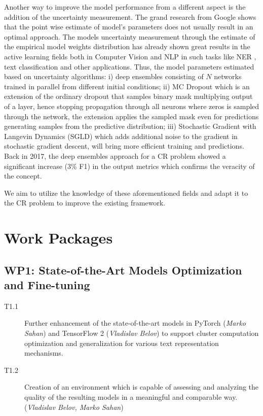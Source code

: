 Another way to improve the model performance from a different aspect is the addition of the uncertainty measurement. 
The grand research from Google \cite{ovadia2019can} shows that the point wise estimate of model’s parameters does not usually result in an optimal approach. The models uncertainty measurement through the estimate of the empirical model weights distribution has already shown great results in the active learning fields both in Computer Vision \cite{gal2017deep} and NLP in such tasks like NER \cite{shen2017deep, lowell2018practical}, text classification \cite{an2018deep} and other applications. 
Thus, the model parameters estimated based on uncertainty algorithms: i) deep ensembles \cite{lakshminarayanan2016simple} consisting of $N$ networks trained in parallel from different initial conditions; ii) MC Dropout \cite{gal2017deep} which is an extension of the ordinary dropout that samples binary mask multiplying output of a layer, hence stopping propagation through all neurons where zeros is sampled through the network, the extension applies the sampled mask even for predictions generating samples from the predictive distribution; iii) Stochastic Gradient with Langevin Dynamics (SGLD) \cite{welling2011bayesian} which adds additional noise to the gradient in stochastic gradient descent, will bring more efficient training and predictions. 
Back in 2017, the deep ensembles approach for a CR problem \cite{cr-Lee17} showed a significant increase (3\% F1) in the output metrics which confirms the veracity of the concept.

We aim to utilize the knowledge of these aforementioned fields and adapt it to the CR problem to improve the existing framework.

\section{Work Packages}\label{sec:wp}

\subsection*{WP1: State-of-the-Art Models Optimization and Fine-tuning}

\begin{description}
	\item [T1.1] Further enhancement of the state-of-the-art models in PyTorch (\textit{Marko Sahan}) and TensorFlow 2 (\textit{Vladislav Belov}) to support cluster computation optimization and generalization for various text representation mechanisms.
	\item [T1.2] Creation of an environment which is capable of assessing and analyzing the quality of the resulting models in a meaningful and comparable way. (\textit{Vladislav Belov, Marko Sahan})

\end{description}


